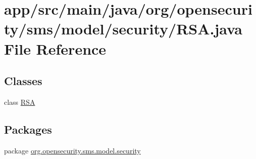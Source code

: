 \hypertarget{a00027}{\section{app/src/main/java/org/opensecurity/sms/model/security/\+R\+S\+A.java File Reference}
\label{a00027}
}
\subsection*{Classes}
\begin{DoxyCompactItemize}
\item 
class \hyperlink{a00014}{R\+S\+A}
\end{DoxyCompactItemize}
\subsection*{Packages}
\begin{DoxyCompactItemize}
\item 
package \hyperlink{a00040}{org.\+opensecurity.\+sms.\+model.\+security}
\end{DoxyCompactItemize}
